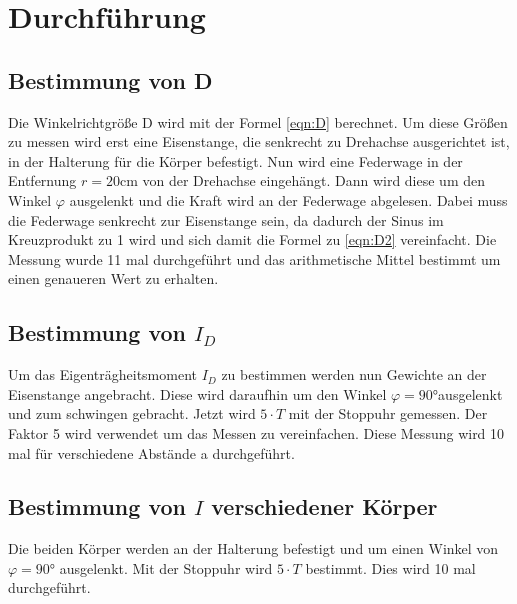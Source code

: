 \section{Durchführung}
\label{sec:Durchführung}
    \subsection{Bestimmung von D}
    Die Winkelrichtgröße D wird mit der Formel \ref{eqn:D} berechnet.
    Um diese Größen zu messen wird erst eine Eisenstange, die senkrecht zu Drehachse ausgerichtet ist, in der Halterung für die Körper befestigt.
    Nun wird eine Federwage in der Entfernung $r = 20$\unit{\centi\meter} von der Drehachse eingehängt.
    Dann wird diese um den Winkel $\varphi$ ausgelenkt und die Kraft wird an der Federwage abgelesen.
    Dabei muss die Federwage senkrecht zur Eisenstange sein, da dadurch der Sinus im Kreuzprodukt zu 1 wird und sich damit die Formel zu \ref{eqn:D2} vereinfacht.
    Die Messung wurde 11 mal durchgeführt und das arithmetische Mittel bestimmt um einen genaueren Wert zu erhalten.

    \subsection{Bestimmung von $I_D$}
    Um das Eigenträgheitsmoment $I_D$ zu bestimmen werden nun Gewichte an der Eisenstange angebracht. 
    Diese wird daraufhin um den Winkel $\varphi = 90$\unit{\degree}ausgelenkt und zum schwingen gebracht.
    Jetzt wird $5 \cdot T$ mit der Stoppuhr gemessen. 
    Der Faktor 5 wird verwendet um das Messen zu vereinfachen. 
    Diese Messung wird 10 mal für verschiedene Abstände a durchgeführt.

    \subsection{Bestimmung von $I$ verschiedener Körper}
    Die beiden Körper werden an der Halterung befestigt und um einen Winkel von $\varphi= 90$\unit{\degree} ausgelenkt.
    Mit der Stoppuhr wird $5 \cdot T$ bestimmt. 
    Dies wird 10 mal durchgeführt.%

